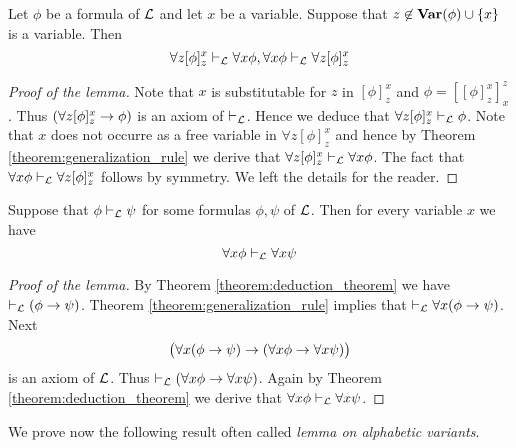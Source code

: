 \documentclass[10pt]{amsart}
\begin{document}
\begin{lemma}\label{lemma:alpha_conversion}
	Let $\phi$ be a formula of ${\mathcal L}$ and let $x$ be a variable. Suppose that $z \not \in \mathbf{Var}(\phi) \cup \{x\}$ is a variable. Then
	$$\forall z[\phi]^x_z \vdash_{{\mathcal L}} \forall x\phi, \forall x\phi \vdash_{{\mathcal L}} \forall z[\phi]^x_z$$
\end{lemma}
\begin{proof}[Proof of the lemma]
	Note that $x$ is substitutable for $z$ in $[\phi]^x_z$ and $\phi = [[\phi]^x_z]^z_x$. Thus $(\forall z[\phi]^x_z \rightarrow \phi)$ is an axiom of $\vdash_{{\mathcal L}}$. Hence we deduce that $\forall z[\phi]^x_z \vdash_{{\mathcal L}} \phi$. Note that $x$ does not occurre as a free variable in $\forall z[\phi]^x_z$ and hence by Theorem \ref{theorem:generalization_rule} we derive that $\forall z[\phi]^x_z  \vdash_{{\mathcal L}} \forall x\phi$. The fact that $\forall x \phi \vdash_{{\mathcal L}} \forall z[\phi]^x_z$ follows by symmetry. We left the details for the reader.
\end{proof}

\begin{lemma}\label{lemma:deduction_implies_quantified_deduction}
	Suppose that $\phi \vdash_{{\mathcal L}} \psi$ for some formulas $\phi, \psi$ of ${\mathcal L}$. Then for every variable $x$ we have
	$$\forall x\phi \vdash_{{\mathcal L}} \forall x\psi$$
\end{lemma}
\begin{proof}[Proof of the lemma]
	By Theorem \ref{theorem:deduction_theorem} we have $\vdash_{{\mathcal L}} (\phi \rightarrow \psi)$. Theorem \ref{theorem:generalization_rule} implies that $\vdash_{{\mathcal L}} \forall x(\phi \rightarrow \psi)$. Next
	$$\big(\forall x(\phi \rightarrow \psi) \rightarrow (\forall x\phi \rightarrow \forall x\psi)\big)$$
	is an axiom of ${\mathcal L}$. Thus $\vdash_{{\mathcal L}} (\forall x\phi \rightarrow \forall x\psi)$. Again by Theorem \ref{theorem:deduction_theorem} we derive that $\forall x\phi \vdash_{{\mathcal L}} \forall x\psi$.
\end{proof}
\noindent
We prove now the following result often called \textit{lemma on alphabetic variants}.
\end{document}

